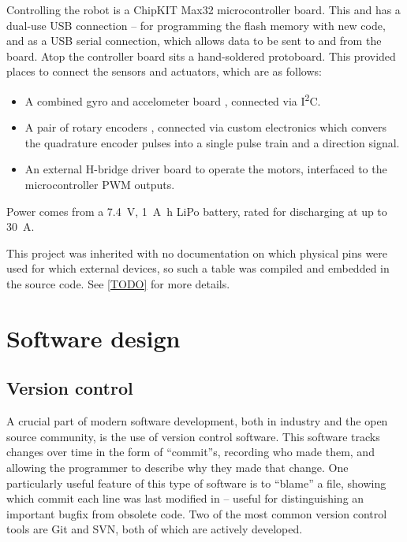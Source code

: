 \documentclass[main.tex]{subfiles}
\begin{document}
	Controlling the robot is a ChipKIT Max32 microcontroller board\cite{max32}. This and has a dual-use USB connection -- for programming the flash memory with new code, and as a USB serial connection, which allows data to be sent to and from the board. Atop the controller board sits a hand-soldered protoboard. This provided places to connect the sensors and actuators, which are as follows:
	\begin{itemize}[noitemsep]
		\item
			A combined gyro and accelometer board \cite{imu}, connected via I\textsuperscript{2}C.
		\item
			A pair of rotary encoders \cite{encoder}, connected via custom electronics which convers the quadrature encoder pulses into a single pulse train and a direction signal.
		\item
			An external H-bridge driver board to operate the motors, interfaced to the microcontroller PWM outputs.
	\end{itemize}
	Power comes from a \SI{7.4}{\volt}, \SI{1}{\ampere\hour}  LiPo battery, rated for discharging at up to \SI{30}{\ampere}.

	This project was inherited with no documentation on which physical pins were used for which external devices, so such a table was compiled and embedded in the source code.
	See \cref{TODO} for more details.

\section{Software design}

	\subsection{Version control}

	A crucial part of modern software development, both in industry and the open source community, is the use of version control software. 
	This software tracks changes over time in the form of \enquote{commit}s, recording who made them, and allowing the programmer to describe why they made that change.
	One particularly useful feature of this type of software is to \enquote{blame} a file, showing which commit each line was last modified in -- useful for distinguishing an important bugfix from obsolete code.
	Two of the most common version control tools are Git and SVN, both of which are actively developed.
\end{document}
